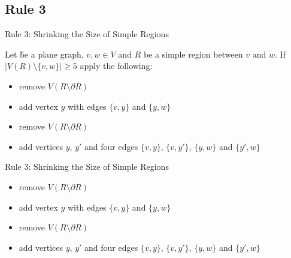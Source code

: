 \subsection{Rule 3}
\begin{frame}[c]{Rule 3: Shrinking the Size of Simple Regions}

Let \G be a plane graph, $v, w \in V$ and $R$ be a simple region between $v$ and $w$. If $|V(R) \setminus \{v, w\}| \geq 5$ apply the following:

\begin{caseof}

            \begin{itemize}
                    \item remove $V(R\setminus\partial R)$
                    \item add vertex $y$ with edges $\{v, y\}$ and $\{y, w\}$
            \end{itemize}


            \begin{itemize}
                    \item remove $V(R\setminus\partial R)$
                    \item add vertices $y$, $y'$ and four edges $\{v,y\}$, $\{v, y'\}$, $\{y, w\}$ and $\{y', w\}$
            \end{itemize}
        \end{caseof}
\end{frame}

\begin{frame}[c]{Rule 3: Shrinking the Size of Simple Regions}

    \begin{caseof}
        {\bfseries

            \begin{itemize}
                    \item remove $V(R\setminus\partial R)$
                    \item add vertex $y$ with edges $\{v, y\}$ and $\{y, w\}$
            \end{itemize}
        }


            \begin{itemize}
                    \item remove $V(R\setminus\partial R)$
                    \item add vertices $y$, $y'$ and four edges $\{v,y\}$, $\{v, y'\}$, $\{y, w\}$ and $\{y', w\}$
            \end{itemize}
        \end{caseof}

    \begin{figure}[!ht]
    \end{figure}
\end{frame}

